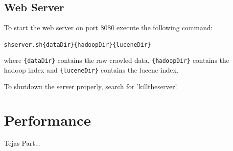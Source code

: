 \documentclass[11pt]{article}
\begin{document}
	\subsection{Web Server}	
		To start the web server on port 8080 execute the following command:
		\begin{alltt}
			sh server.sh \{dataDir\} \{hadoopDir\} \{luceneDir\}
		\end{alltt}	
		where \texttt{\{dataDir\}} contains the raw crawled data, \texttt{\{hadoopDir\}} contains the hadoop index and \texttt{\{luceneDir\}} contains the lucene index.

		To shutdown the server properly, search for 'killtheserver'.
\section{Performance}
	Tejas Part...
\end{document}
